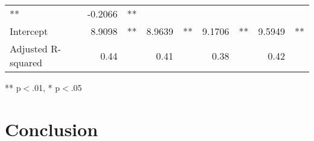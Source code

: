 \documentclass[12pt]{article}
\begin{document}
\begin{table}[!h]
\begin{tabular}{lllllllll}
  \multicolumn{1}{l}{**} &
  \multicolumn{1}{r}{-0.2066} &
  \multicolumn{1}{l}{**} \\
\multicolumn{1}{l}{Intercept} &
  \multicolumn{1}{r}{8.9098} &
  \multicolumn{1}{l}{**} &
  \multicolumn{1}{r}{8.9639} &
  \multicolumn{1}{l}{**} &
  \multicolumn{1}{r}{9.1706} &
  \multicolumn{1}{l}{**} &
  \multicolumn{1}{r}{9.5949} &
  \multicolumn{1}{l}{**} \\
\multicolumn{1}{l}{Adjusted R-squared} &
  \multicolumn{1}{r}{0.44} &
  \multicolumn{1}{l}{} &
  \multicolumn{1}{r}{0.41} &
  \multicolumn{1}{l}{} &
  \multicolumn{1}{r}{0.38} &
  \multicolumn{1}{l}{} &
  \multicolumn{1}{r}{0.42} &
  \multicolumn{1}{l}{} \\
\cline{1-9}
\end{tabular}

\footnotesize{
** p$<$.01, * p$<$.05
}
\end{table}


\section{Conclusion}

\clearpage


\end{document}
